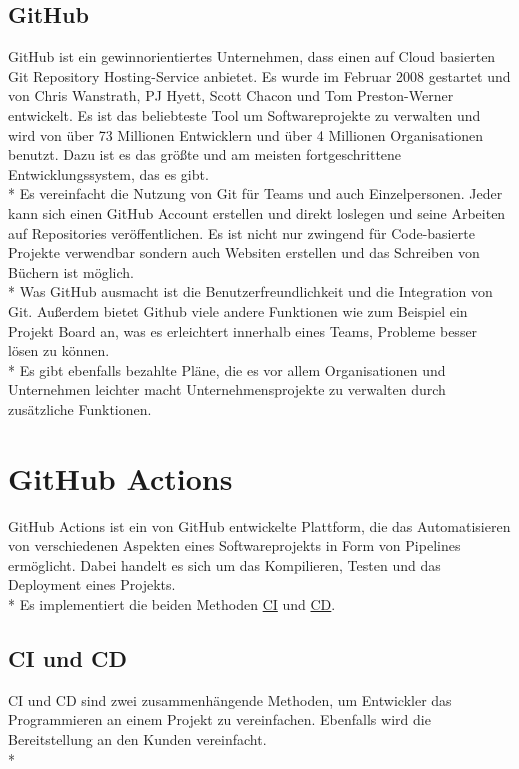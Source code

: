 \subsection{GitHub}
GitHub ist ein gewinnorientiertes Unternehmen, dass einen auf Cloud basierten Git Repository Hosting-Service anbietet.
Es wurde im Februar 2008 gestartet und von Chris Wanstrath, PJ Hyett, Scott Chacon und Tom Preston-Werner entwickelt.
Es ist das beliebteste Tool um Softwareprojekte zu verwalten und wird von über 73 Millionen Entwicklern und über 4 Millionen Organisationen
benutzt. Dazu ist es das größte und am meisten fortgeschrittene Entwicklungssystem, das es gibt. \cite{GitHub} \\*
Es vereinfacht die Nutzung von Git für Teams und auch Einzelpersonen. 
Jeder kann sich einen GitHub Account erstellen und direkt loslegen und seine Arbeiten auf Repositories veröffentlichen.
Es ist nicht nur zwingend für Code-basierte Projekte verwendbar sondern auch Websiten erstellen und das Schreiben von Büchern ist möglich.
\\*
Was GitHub ausmacht ist die Benutzerfreundlichkeit und die Integration von Git. Außerdem bietet Github viele andere Funktionen wie zum Beispiel ein Projekt Board an,
was es erleichtert innerhalb eines Teams, Probleme besser lösen zu können. \\*
Es gibt ebenfalls bezahlte Pläne, die es vor allem Organisationen und Unternehmen leichter macht Unternehmensprojekte zu verwalten durch zusätzliche Funktionen.
\cite{GitKinsta}

\section{GitHub Actions}
\label{sec:GHAction}
\author{Benjamin Besic}

GitHub Actions ist ein von GitHub entwickelte Plattform, die das Automatisieren von verschiedenen Aspekten eines Softwareprojekts in Form von Pipelines ermöglicht.
Dabei handelt es sich um das Kompilieren, Testen und das Deployment eines Projekts. \\*
Es implementiert die beiden Methoden \hyperref[sec:CI]{CI} und \hyperref[sec:CD]{CD}. \cite{GHAction}

\subsection{CI und CD}
CI und CD sind zwei zusammenhängende Methoden, um Entwickler das Programmieren an einem Projekt zu vereinfachen. Ebenfalls wird die Bereitstellung 
an den Kunden vereinfacht. \\*

